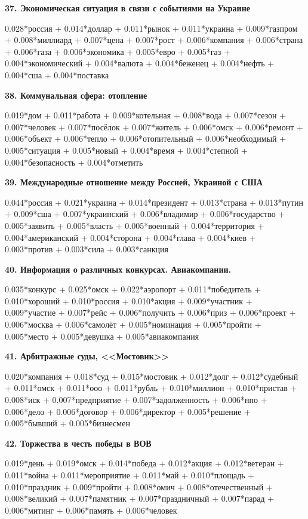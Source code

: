 \textbf{37. Экономическая ситуация в связи с событиями на Украине}

0.028*россия + 0.014*доллар + 0.011*рынок + 0.011*украина + 0.009*газпром + 0.008*миллиард + 0.007*цена + 0.007*рост + 0.006*компания + 0.006*страна + 0.006*газа + 0.006*экономика + 0.005*евро + 0.005*газ + 0.004*экономический + 0.004*валюта + 0.004*беженец + 0.004*нефть + 0.004*сша + 0.004*поставка

\textbf{38. Коммунальная сфера: отопление}

0.019*дом + 0.011*работа + 0.009*котельная + 0.008*вода + 0.007*сезон + 0.007*человек + 0.007*посёлок + 0.007*житель + 0.006*омск + 0.006*ремонт + 0.006*объект + 0.006*тепло + 0.006*отопительный + 0.006*необходимый + 0.005*ситуация + 0.005*новый + 0.004*время + 0.004*степной + 0.004*безопасность + 0.004*отметить

\textbf{39. Международные отношение между Россией, Украиной с США}

0.044*россия + 0.021*украина + 0.014*президент + 0.013*страна + 0.013*путин + 0.009*сша + 0.007*украинский + 0.006*владимир + 0.006*государство + 0.005*заявить + 0.005*власть + 0.005*военный + 0.004*территория + 0.004*американский + 0.004*сторона + 0.004*глава + 0.004*киев + 0.003*против + 0.003*сила + 0.003*санкция

\textbf{40. Информация о различных конкурсах. Авиакомпании.}

0.035*конкурс + 0.025*омск + 0.022*аэропорт + 0.011*победитель + 0.010*хороший + 0.010*россия + 0.010*акция + 0.009*участник + 0.009*участие + 0.007*рейс + 0.006*получить + 0.006*приз + 0.006*проект + 0.006*москва + 0.006*самолёт + 0.005*номинация + 0.005*пройти + 0.005*место + 0.005*девушка + 0.005*авиакомпания

\textbf{41. Арбитражные суды, <<Мостовик>>\footnotemark}

0.020*компания + 0.018*суд + 0.015*мостовик + 0.012*долг + 0.012*судебный + 0.011*омск + 0.011*ооо + 0.011*рубль + 0.010*миллион + 0.010*пристав + 0.008*иск + 0.007*предприятие + 0.007*задолженность + 0.006*нпо + 0.006*дело + 0.006*договор + 0.006*директор + 0.005*решение + 0.005*бывший + 0.005*бизнесмен

\textbf{42. Торжества в честь победы в ВОВ}

0.019*день + 0.019*омск + 0.014*победа + 0.012*акция + 0.012*ветеран + 0.011*война + 0.011*мероприятие + 0.011*май + 0.010*площадь + 0.010*праздник + 0.009*пройти + 0.008*омич + 0.008*отечественный + 0.008*великий + 0.007*памятник + 0.007*праздничный + 0.007*парад + 0.006*митинг + 0.006*память + 0.006*человек


